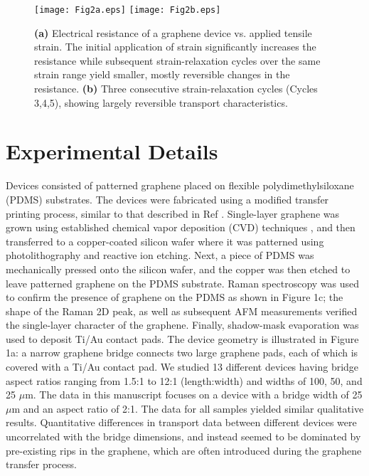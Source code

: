 \documentclass[%
 aps,
 pra,
 longbibliography,
 amsmath,amssymb,
 reprint,
 superscriptaddress,
]{revtex4-1}
\begin{document}
\begin{figure*}
\texttt{[image: Fig2a.eps]}
\texttt{[image: Fig2b.eps]}
\caption{\textbf{(a)} Electrical resistance of a graphene device vs. applied
    tensile strain. The initial application of strain significantly increases the
    resistance while subsequent strain-relaxation cycles over the same strain range
    yield smaller, mostly reversible changes in the resistance. \textbf{(b)} Three
    consecutive strain-relaxation cycles (Cycles 3,4,5), showing largely reversible
    transport characteristics.}
\label{fig:RvsStrain}
\end{figure*}



\section{Experimental Details}

Devices consisted of patterned graphene placed on flexible polydimethylsiloxane
(PDMS) substrates. The devices were fabricated using a modified transfer
printing process, similar to that described in Ref .
Single-layer graphene was grown using established chemical vapor deposition
(CVD) techniques \cite{Li2009}, and then transferred to a copper-coated silicon
wafer where it was patterned using photolithography and reactive ion etching.
Next, a piece of PDMS was mechanically pressed onto the silicon wafer, and the
copper was then etched to leave patterned graphene on the PDMS
substrate\cite{Lee2010}. Raman spectroscopy was used to confirm the presence of
graphene on the PDMS as shown in Figure 1c; the shape of the Raman 2D
peak\cite{Ferrari2006}, as well as subsequent AFM measurements verified the
single-layer character of the graphene. Finally, shadow-mask evaporation was
used to deposit Ti/Au contact pads. The device geometry is illustrated in
Figure 1a: a narrow graphene bridge connects two large graphene pads, each of
which is covered with a Ti/Au contact pad. We studied 13 different devices
having bridge aspect ratios ranging from 1.5:1 to 12:1 (length:width) and
widths of 100, 50, and 25 $\mu$m. The data in this manuscript focuses on a
device with a bridge width of 25 $\mu$m and an aspect ratio of 2:1. The data
for all samples yielded similar qualitative results. Quantitative differences
in transport data between different devices were uncorrelated with the bridge
dimensions, and instead seemed to be dominated by pre-existing rips in the
graphene, which are often introduced during the graphene transfer
process\cite{Kim2012}.
\end{document}
